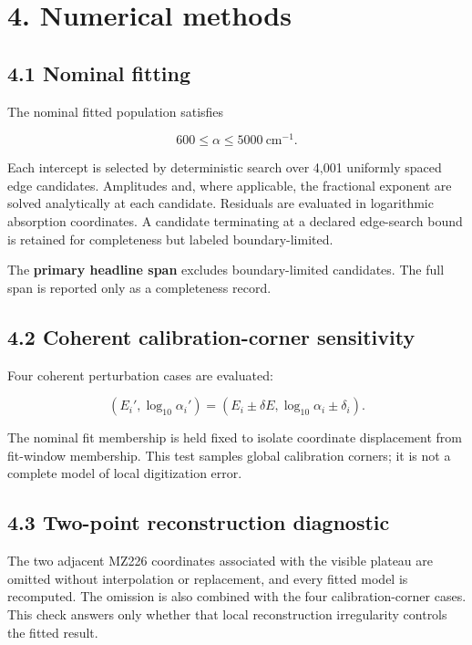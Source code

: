 \section{4. Numerical methods}\label{numerical-methods}

\subsection{4.1 Nominal fitting}\label{nominal-fitting}

The nominal fitted population satisfies

\[
600\leq\alpha\leq5000\ \mathrm{cm}^{-1}.
\]

Each intercept is selected by deterministic search over 4,001 uniformly
spaced edge candidates. Amplitudes and, where applicable, the fractional
exponent are solved analytically at each candidate. Residuals are
evaluated in logarithmic absorption coordinates. A candidate terminating
at a declared edge-search bound is retained for completeness but labeled
boundary-limited.

The \textbf{primary headline span} excludes boundary-limited candidates.
The full span is reported only as a completeness record.

\subsection{4.2 Coherent calibration-corner
sensitivity}\label{coherent-calibration-corner-sensitivity}

Four coherent perturbation cases are evaluated:

\[
(E_i',\log_{10}\alpha_i')=
(E_i\pm\delta E,\log_{10}\alpha_i\pm\delta_i).
\]

The nominal fit membership is held fixed to isolate coordinate
displacement from fit-window membership. This test samples global
calibration corners; it is not a complete model of local digitization
error.

\subsection{4.3 Two-point reconstruction
diagnostic}\label{two-point-reconstruction-diagnostic}

The two adjacent MZ226 coordinates associated with the visible plateau
are omitted without interpolation or replacement, and every fitted model
is recomputed. The omission is also combined with the four
calibration-corner cases. This check answers only whether that local
reconstruction irregularity controls the fitted result.

